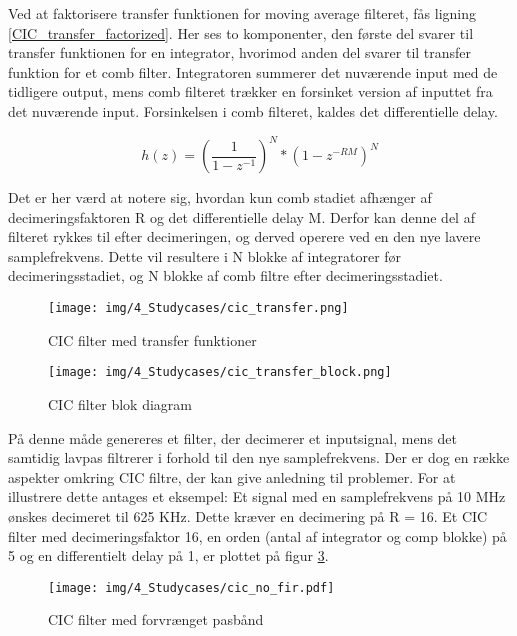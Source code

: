 \begin{appendices}
Ved at faktorisere transfer funktionen for moving average filteret, fås ligning \ref{CIC_transfer_factorized}. Her ses to komponenter, den første del svarer til transfer funktionen for en integrator, hvorimod anden del svarer til transfer funktion for et comb filter. Integratoren summerer det nuværende input med de tidligere output, mens comb filteret trækker en forsinket version af inputtet fra det nuværende input. Forsinkelsen i comb filteret, kaldes det differentielle delay. 

\begin{equation} \label{CIC_transfer_factorized}
h(z) = (\frac{1}{1 - z^{-1}})^N * (1 - z^{-RM})^N
\end{equation}

Det er her værd at notere sig, hvordan kun comb stadiet afhænger af decimeringsfaktoren R og det differentielle delay M. Derfor kan denne del af filteret rykkes til efter decimeringen, og derved operere ved en den nye lavere samplefrekvens. Dette vil resultere i N blokke af integratorer før decimeringsstadiet, og N blokke af comb filtre efter decimeringsstadiet. 

\begin{figure}[H]
	\centering{}
	\texttt{[image: img/4\_Studycases/cic\_transfer.png]}
	\caption{CIC filter med transfer funktioner}
	\label{fig:cic_transfer}
\end{figure} 

\begin{figure}[H]
	\centering{}
	\texttt{[image: img/4\_Studycases/cic\_transfer\_block.png]}
	\caption{CIC filter blok diagram}
	\label{fig:cic_transfer_block}
\end{figure} 

På denne måde genereres et filter, der decimerer et inputsignal, mens det samtidig lavpas filtrerer i forhold til den nye samplefrekvens. Der er dog en række aspekter omkring CIC filtre, der kan give anledning til problemer. For at illustrere dette antages et eksempel: Et signal med en samplefrekvens på 10 MHz ønskes decimeret til 625 KHz. Dette kræver en decimering på R = 16. Et CIC filter med decimeringsfaktor 16, en orden (antal af integrator og comp blokke) på 5 og en differentielt delay på 1, er plottet på figur \ref{fig:cic_no_fir}.

\begin{figure}[H]
	\centering{}
	\texttt{[image: img/4\_Studycases/cic\_no\_fir.pdf]}
	\caption{CIC filter med forvrænget pasbånd}
	\label{fig:cic_no_fir}
\end{figure} 


\end{appendices}
